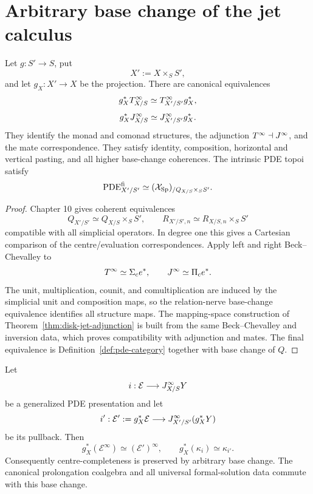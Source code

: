 \section{Arbitrary base change of the jet calculus}
\label{sec:jet-base-change}

\begin{theorem}
\label{thm:jet-arbitrary-base-change}
Let $g:S'\to S$, put
\[
    X':=X\times_SS',
\]
and let $g_X:X'\to X$ be the projection.  There are canonical equivalences
\[
    g_X^*T^{\infty}_{X/S}
    \simeq
    T^{\infty}_{X'/S'}g_X^*,
\]
\[
    g_X^*J^{\infty}_{X/S}
    \simeq
    J^{\infty}_{X'/S'}g_X^*.
\]
They identify the monad and comonad structures, the adjunction $T^{\infty}\dashv J^{\infty}$, and the mate correspondence.  They satisfy identity, composition, horizontal and vertical pasting, and all higher base-change coherences.  The intrinsic PDE topoi satisfy
\[
    \operatorname{PDE}^{\mathrm{fi}}_{X'/S'}
    \simeq
    (\mathcal{X}_{\mathrm{Sp}})_{/Q_{X/S}\times_SS'}.
\]
\end{theorem}

\begin{proof}
Chapter 10 gives coherent equivalences
\[
    Q_{X'/S'}\simeq Q_{X/S}\times_SS',
    \qquad
    R_{X'/S',n}\simeq R_{X/S,n}\times_SS'
\]
compatible with all simplicial operators.  In degree one this gives a Cartesian comparison of the centre/evaluation correspondences.  Apply left and right Beck--Chevalley to
\[
    T^{\infty}\simeq\Sigma_ce^*,
    \qquad
    J^{\infty}\simeq\Pi_ce^*.
\]
The unit, multiplication, counit, and comultiplication are induced by the simplicial unit and composition maps, so the relation-nerve base-change equivalence identifies all structure maps.  The mapping-space construction of Theorem~\ref{thm:disk-jet-adjunction} is built from the same Beck--Chevalley and inversion data, which proves compatibility with adjunction and mates.  The final equivalence is Definition~\ref{def:pde-category} together with base change of $Q$.
\end{proof}

\begin{corollary}
\label{cor:jet-pde-base-change}
Let
\[
    i:\mathcal E\longrightarrow J^{\infty}_{X/S}Y
\]
be a generalized PDE presentation and let
\[
    i':\mathcal E':=g_X^*\mathcal E
    \longrightarrow
    J^{\infty}_{X'/S'}(g_X^*Y)
\]
be its pullback.  Then
\[
    g_X^*(\mathcal E^\infty)
    \simeq
    (\mathcal E')^\infty,
    \qquad
    g_X^*(\kappa_i)
    \simeq
    \kappa_{i'}.
\]
Consequently centre-completeness is preserved by arbitrary base change.  The canonical prolongation coalgebra and all universal formal-solution data commute with this base change.
\end{corollary}

